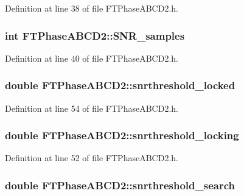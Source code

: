 Definition at line 38 of file FTPhaseABCD2.h.

\hypertarget{classFTPhaseABCD2_aef1a8f3c2bfcedfc10876490fb4bb455}{
\subsubsection[{SNR\_\-samples}]{\setlength{\rightskip}{0pt plus 5cm}int {\bf FTPhaseABCD2::SNR\_\-samples}}}
\label{classFTPhaseABCD2_aef1a8f3c2bfcedfc10876490fb4bb455}


Definition at line 40 of file FTPhaseABCD2.h.

\hypertarget{classFTPhaseABCD2_a362844ab768079d3668bffb950ca5d08}{
\subsubsection[{snrthreshold\_\-locked}]{\setlength{\rightskip}{0pt plus 5cm}double {\bf FTPhaseABCD2::snrthreshold\_\-locked}}}
\label{classFTPhaseABCD2_a362844ab768079d3668bffb950ca5d08}


Definition at line 54 of file FTPhaseABCD2.h.

\hypertarget{classFTPhaseABCD2_a15a2278557cd673190b99c846ac92d82}{
\subsubsection[{snrthreshold\_\-locking}]{\setlength{\rightskip}{0pt plus 5cm}double {\bf FTPhaseABCD2::snrthreshold\_\-locking}}}
\label{classFTPhaseABCD2_a15a2278557cd673190b99c846ac92d82}


Definition at line 52 of file FTPhaseABCD2.h.

\hypertarget{classFTPhaseABCD2_a2b6f4cf6d8ddaa87e3e49f840654acc7}{
\subsubsection[{snrthreshold\_\-search}]{\setlength{\rightskip}{0pt plus 5cm}double {\bf FTPhaseABCD2::snrthreshold\_\-search}}}
\label{classFTPhaseABCD2_a2b6f4cf6d8ddaa87e3e49f840654acc7}


